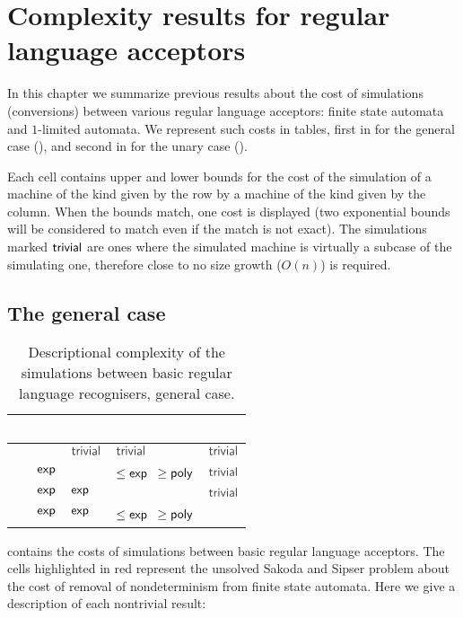 \chapter{Complexity results for regular language acceptors}
In this chapter we summarize previous results about the cost of simulations (conversions) between various regular language acceptors: finite state automata and $1$-limited automata.
We represent such costs in tables, first in  for the general case (), and second in  for the unary case ().

Each cell contains upper and lower bounds for the cost of the simulation of a machine of the kind given by the row by a machine of the kind given by the column.
When the bounds match, one cost is displayed (two exponential bounds will be considered to match even if the match is not exact).
The simulations marked $\mathsf{trivial}$ are ones where the simulated machine is virtually a subcase of the simulating one, therefore close to no size growth ($O(n)$) is required.



\section{The general case}\label{sec:prevsims-general}

\begin{table}
	\centering
	\renewcommand{\hstdef}{.35}
	\begin{tabular}{|l|l|l|p{2.9em}|l|}
		\hline
		~     & \ODFA   & \ONFA     & \TDFA                          & \TNFA     \\ \hline
		\ODFA & \cY     & $\Cctriv$ & $\Cctriv$                      & $\Cctriv$ \\ \hline
		\ONFA & $\mathsf{exp}$ & \cY       & \cR $\le\Cexp\hst$ $\ge\mathsf{poly}$ & $\Cctriv$ \\ \hline
		\TDFA & $\mathsf{exp}$ & $\mathsf{exp}$   & \cY                            & $\Cctriv$ \\ \hline
		\TNFA & $\mathsf{exp}$ & $\mathsf{exp}$   & \cR $\le\Cexp\hst$ $\ge\mathsf{poly}$ & \cY       \\ \hline
	\end{tabular}
	\caption{Descriptional complexity of the simulations between basic regular language recognisers, general case.}
	\label{tab:sims-core-general}
\end{table}

 contains the costs of simulations between basic regular language acceptors.
The cells highlighted in red represent the unsolved Sakoda and Sipser problem \cite{SakSip78} about the cost of removal of nondeterminism from finite state automata.
Here we give a description of each nontrivial result:

